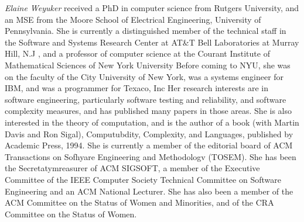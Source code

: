 \documentclass[journal, twoside]{IEEEtran}
\begin{document}
\textit{Elaine Weyuker} received a PhD in computer science from Rutgers University, and an MSE from the
Moore School of Electrical Engineering, University
of Pennsylvania. She is currently a distinguished
member of the technical staff in the Software and
Systems Research Center at AT&T Bell Laboratories
at Murray Hill, N.J , and a professor of computer
science at the Courant Institute of Mathematical
Sciences of New York University Before coming to
NYU, she was on the faculty of the City University
of New York, was a systems engineer for IBM, and
was a programmer for Texaco, Inc Her research interests are in software
engineering, particularly software testing and reliability, and software complexity measures, and has published many papers in those areas. She is also
interested in the theory of computation, and is the author of a book (with
Martin Davis and Ron Sigal), Computubdity, Complexity, and Languages,
published by Academic Press, 1994. She is currently a member of the editorial board of ACM Transactions on Sofhyare Engineering and Methodologv
(TOSEM). She has been the Secretatymreasurer of ACM SIGSOFT, a member of the Executive Committee of the IEEE Computer Society Technical
Committee on Software Engineering and an ACM National Lecturer. She has
also been a member of the ACM Committee on the Status of Women and
Minorities, and of the CRA Committee on the Status of Women. 
\end{document}
